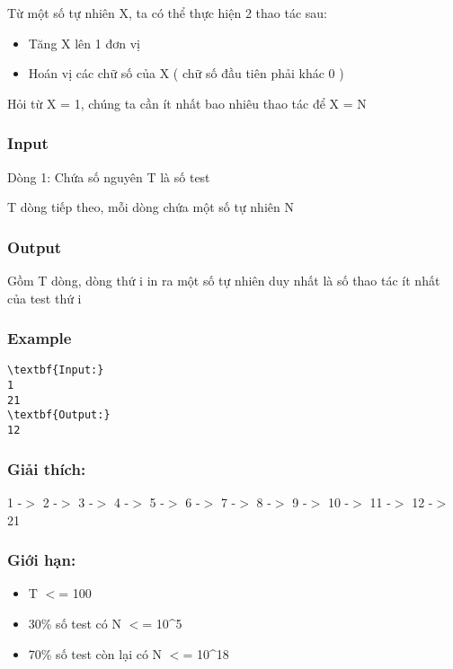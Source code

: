 

Từ một số tự nhiên X, ta có thể thực hiện 2 thao tác sau:
\begin{itemize}
	\item Tăng X lên 1 đơn vị
	\item Hoán vị các chữ số của X ( chữ số đầu tiên phải khác 0 )
\end{itemize}

Hỏi từ X = 1, chúng ta cần ít nhất bao nhiêu thao tác để X = N

\subsubsection{Input}

Dòng 1: Chứa số nguyên T là số test

T dòng tiếp theo, mỗi dòng chứa một số tự nhiên N

\subsubsection{Output}

Gồm T dòng, dòng thứ i in ra một số tự nhiên duy nhất là số thao tác ít nhất của test thứ i

\subsubsection{Example}
\begin{verbatim}
\textbf{Input:}
1
21
\textbf{Output:}
12\end{verbatim}

\subsubsection{Giải thích:}

1 -$>$ 2 -$>$ 3 -$>$ 4 -$>$ 5 -$>$ 6 -$>$ 7 -$>$ 8 -$>$ 9 -$>$ 10 -$>$ 11 -$>$ 12 -$>$ 21

\subsubsection{Giới hạn:}
\begin{itemize}
	\item T $<$= 100
	\item 30\% số test có N $<$= 10\textasciicircum5
	\item 70\% số test còn lại có N $<$= 10\textasciicircum18
\end{itemize}